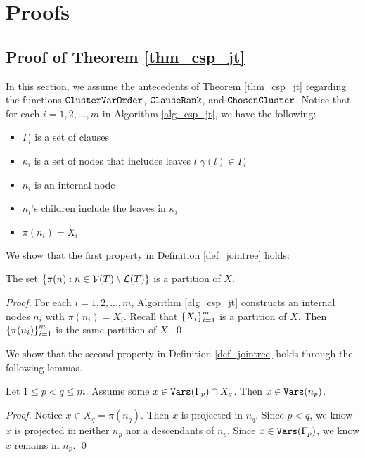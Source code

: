 \section{Proofs}
\label{sec_proofs}


\subsection{Proof of Theorem \ref{thm_csp_jt}}

In this section, we assume the antecedents of Theorem \ref{thm_csp_jt} regarding the functions $\texttt{\upshape ClusterVarOrder}$, $\texttt{\upshape ClauseRank}$, and $\texttt{\upshape ChosenCluster}$.
Notice that for each $i = 1, 2, \ldots, m$ in Algorithm \ref{alg_csp_jt}, we have the following:
\begin{itemize}
    \item $\Gamma_i$ is a set of clauses
    \item $\kappa_i$ is a set of nodes that includes leaves $l$ \st{} $\gamma(l) \in \Gamma_i$
    \item $n_i$ is an internal node
    \item $n_i$'s children include the leaves in $\kappa_i$
    \item $\pi(n_i) = X_i$
\end{itemize}

We show that the first property in Definition \ref{def_jointree} holds:
\begin{lemma}
\label{lemma_prop1}
    The set $\left\{ \pi(n) : n \in \mathcal{V}(T) \setminus \mathcal{L}(T) \right\}$ is a partition of $X$.
\end{lemma}
\begin{proof}
    For each $i = 1, 2, \ldots, m$, Algorithm \ref{alg_csp_jt} constructs an internal nodes $n_i$ with $\pi(n_i) = X_i$.
    Recall that $\left\{ X_i \right\}_{i = 1}^m$ is a partition of $X$.
    Then $\left\{ \pi(n_i) \right\}_{i = 1}^m$ is the same partition of $X$.
\qed
\end{proof}

We show that the second property in Definition \ref{def_jointree} holds through the following lemmas.

\begin{lemma}
\label{lemma_unprojected}
    Let $1 \le p < q \le m$.
    Assume some $x \in \texttt{\upshape Vars}(\Gamma_p) \cap X_q$.
    Then $x \in \texttt{\upshape Vars}(n_p)$.
\end{lemma}
\begin{proof}
    Notice $x \in X_q = \pi(n_q)$.
    Then $x$ is projected in $n_q$.
    Since $p < q$, we know $x$ is projected in neither $n_p$ nor a descendants of $n_p$.
    Since $x \in \texttt{\upshape Vars}(\Gamma_p)$, we know $x$ remains in $n_p$.
\qed
\end{proof}


